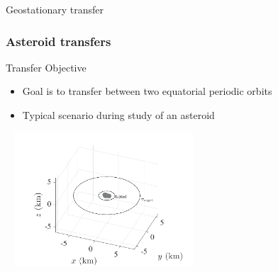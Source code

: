 \begin{frame}{Geostationary  transfer}
\end{frame} %

\subsubsection[Transfers about 4769 Castalia]{Asteroid transfers}

\begin{frame}{Transfer Objective}\label{slide:asteroid_transfer} %

\begin{itemize}
    \item Goal is to transfer between two equatorial periodic orbits
    \item Typical scenario during study of an asteroid~\hyperlink{polyhedron_gravity}{}
\end{itemize}

\begin{center}
    ~\hfill
    \includegraphics[width=0.5\textwidth,height=0.7\textheight,keepaspectratio]{figures/2016AAS/initial_transfer_3d.pdf}
\end{center}

\end{frame}%

